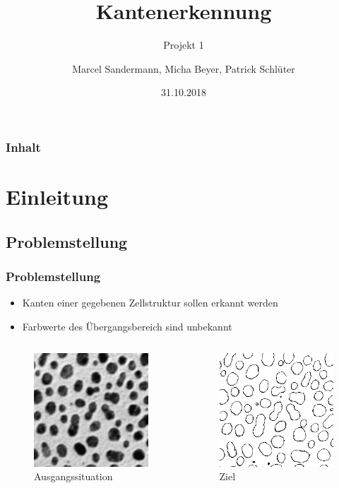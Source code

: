 \documentclass[12pt]{beamer}
\begin{document}
	\author[Gruppe D]{Marcel Sandermann, Micha Beyer, Patrick Schlüter}
	\title{Kantenerkennung}
	\subtitle{Projekt 1}
	\date{31.10.2018}
	
	
\begin{frame}
	\titlepage
\end{frame}
\begin{frame}
	\frametitle{Inhalt}
	\tableofcontents	
\end{frame}
\section{Einleitung}
\subsection{Problemstellung}
\begin{frame}
	\frametitle{Problemstellung}
	\begin{itemize}
		\item Kanten einer gegebenen Zellstruktur sollen erkannt werden
		\item Farbwerte des Übergangsbereich sind unbekannt		
	\end{itemize}
	\begin{columns}[c]
		\begin{figure}
		\includegraphics[width=0.5\linewidth]{Anfang.png}
		\caption{Ausgangssituation}	
		\end{figure}
		\begin{figure}
			\includegraphics[width=0.5\linewidth]{Ergebnis.png}
			\caption{Ziel}
		\end{figure}		 	
	\end{columns}	
\end{frame}
\end{document}
